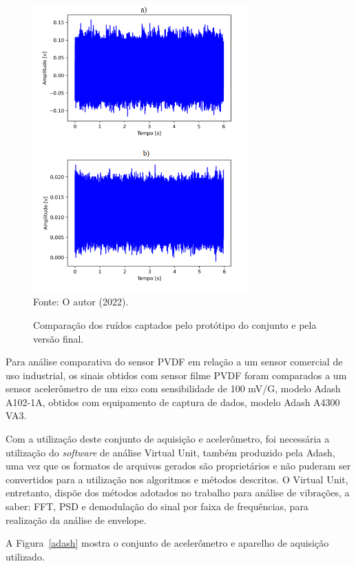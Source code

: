 \documentclass[
	12pt,				
	oneside,			
	a4paper,			
	english,			
	brazil,	
	sumario=abnt-6027-2012		
	]{abntex2ppgsi}
\begin{document}
\begin{figure}[H]
\centering
\caption {Comparação dos ruídos captados pelo protótipo do conjunto e pela versão final.}
\includegraphics[width=\textwidth,height=110mm,keepaspectratio]{comparacao_antes_depois_ruido_circuito} \\
Fonte: O autor (2022).
\label{comparacao_antes_depois_ruido_circuito}
\end{figure} 

Para análise comparativa do sensor PVDF em relação a um sensor comercial de uso industrial, os sinais obtidos com sensor filme PVDF foram comparados a um sensor acelerômetro de um eixo com sensibilidade de 100 mV/G, modelo Adash A102-1A, obtidos com equipamento de captura de dados, modelo Adash A4300 VA3. 

Com a utilização deste conjunto de aquisição e acelerômetro, foi necessária a utilização do \textit{software} de análise Virtual Unit, também produzido pela Adash, uma vez que os formatos de arquivos gerados são proprietários e não puderam ser convertidos para a utilização nos algoritmos e métodos descritos. O Virtual Unit, entretanto, dispõe dos métodos adotados no trabalho para análise de vibrações, a saber: FFT, PSD e demodulação do sinal por faixa de frequências, para realização da análise de envelope.

A Figura~\ref{adash} mostra o conjunto de acelerômetro e aparelho de aquisição utilizado.
\end{document}
